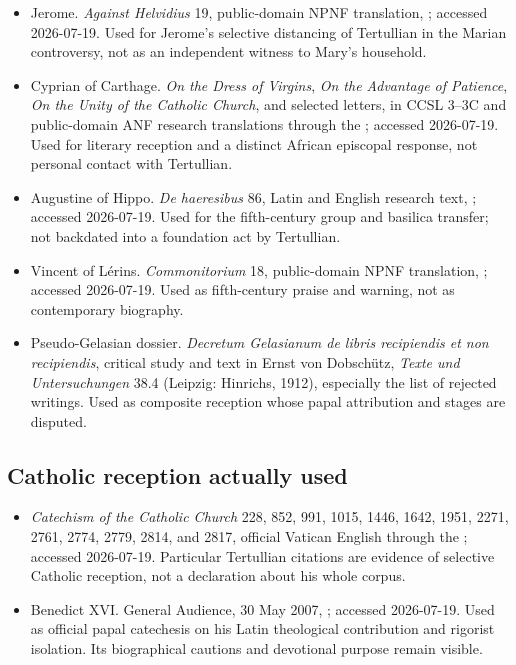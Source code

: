 \begin{itemize}
\item Jerome. \emph{Against Helvidius} 19, public-domain NPNF translation,
; accessed
2026-07-19. Used for Jerome's selective distancing of Tertullian in the Marian
controversy, not as an independent witness to Mary's household.

\item Cyprian of Carthage. \emph{On the Dress of Virgins}, \emph{On the
Advantage of Patience}, \emph{On the Unity of the Catholic Church}, and
selected letters, in CCSL 3--3C and public-domain ANF research translations
through the ; accessed 2026-07-19. Used for literary reception and a distinct
African episcopal response, not personal contact with Tertullian.

\item Augustine of Hippo. \emph{De haeresibus} 86, Latin and English research
text, ; accessed 2026-07-19. Used for the fifth-century group
and basilica transfer; not backdated into a foundation act by Tertullian.

\item Vincent of L\'erins. \emph{Commonitorium} 18, public-domain NPNF
translation, ; accessed 2026-07-19. Used as fifth-century praise and warning, not as
contemporary biography.

\item Pseudo-Gelasian dossier. \emph{Decretum Gelasianum de libris recipiendis
et non recipiendis}, critical study and text in Ernst von Dobsch\"utz,
\emph{Texte und Untersuchungen} 38.4 (Leipzig: Hinrichs, 1912), especially the
list of rejected writings. Used as composite reception whose papal attribution
and stages are disputed.
\end{itemize}

\subsection{Catholic reception actually used}

\begin{itemize}
\item \emph{Catechism of the Catholic Church} 228, 852, 991, 1015, 1446, 1642,
1951, 2271, 2761, 2774, 2779, 2814, and 2817, official Vatican English through
the ; accessed 2026-07-19. Particular Tertullian citations are evidence of
selective Catholic reception, not a declaration about his whole corpus.

\item Benedict XVI\@. General Audience, 30 May 2007,
; accessed 2026-07-19. Used as
official papal catechesis on his Latin theological contribution and rigorist
isolation. Its biographical cautions and devotional purpose remain visible.
\end{itemize}

